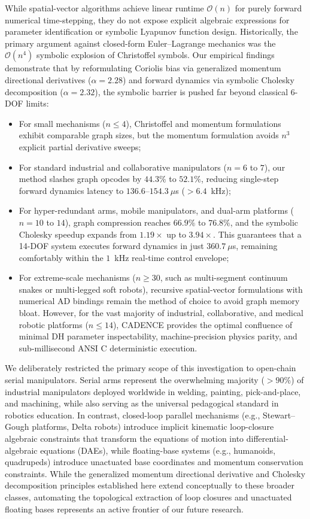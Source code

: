 \documentclass[fleqn,10pt]{article}
\begin{document}
While spatial-vector algorithms achieve linear runtime $\mathcal{O}(n)$ for purely forward numerical time-stepping, they do not expose explicit algebraic expressions for parameter identification or symbolic Lyapunov function design. Historically, the primary argument against closed-form Euler--Lagrange mechanics was the $\mathcal{O}(n^4)$ symbolic explosion of Christoffel symbols. Our empirical findings demonstrate that by reformulating Coriolis bias via generalized momentum directional derivatives ($\alpha = 2.28$) and forward dynamics via symbolic Cholesky decomposition ($\alpha = 2.32$), the symbolic barrier is pushed far beyond classical 6-DOF limits:
\begin{itemize}
	\item For small mechanisms ($n \le 4$), Christoffel and momentum formulations exhibit comparable graph sizes, but the momentum formulation avoids $n^3$ explicit partial derivative sweeps;
	\item For standard industrial and collaborative manipulators ($n = 6$ to $7$), our method slashes graph opcodes by $44.3\%$ to $52.1\%$, reducing single-step forward dynamics latency to $136.6$--$154.3~\mu$s ($>6.4$~kHz);
	\item For hyper-redundant arms, mobile manipulators, and dual-arm platforms ($n = 10$ to $14$), graph compression reaches $66.9\%$ to $76.8\%$, and the symbolic Cholesky speedup expands from $1.19\times$ up to $3.94\times$. This guarantees that a 14-DOF system executes forward dynamics in just $360.7~\mu$s, remaining comfortably within the $1$~kHz real-time control envelope;
	\item For extreme-scale mechanisms ($n \ge 30$, such as multi-segment continuum snakes or multi-legged soft robots), recursive spatial-vector formulations with numerical AD bindings remain the method of choice to avoid graph memory bloat. However, for the vast majority of industrial, collaborative, and medical robotic platforms ($n \le 14$), CADENCE provides the optimal confluence of minimal DH parameter inspectability, machine-precision physics parity, and sub-millisecond ANSI C deterministic execution.
\end{itemize}

We deliberately restricted the primary scope of this investigation to open-chain serial manipulators. Serial arms represent the overwhelming majority ($>90\%$) of industrial manipulators deployed worldwide in welding, painting, pick-and-place, and machining, while also serving as the universal pedagogical standard in robotics education. In contrast, closed-loop parallel mechanisms (e.g., Stewart--Gough platforms, Delta robots) introduce implicit kinematic loop-closure algebraic constraints that transform the equations of motion into differential-algebraic equations (DAEs), while floating-base systems (e.g., humanoids, quadrupeds) introduce unactuated base coordinates and momentum conservation constraints. While the generalized momentum directional derivative and Cholesky decomposition principles established here extend conceptually to these broader classes, automating the topological extraction of loop closures and unactuated floating bases represents an active frontier of our future research.
\end{document}
